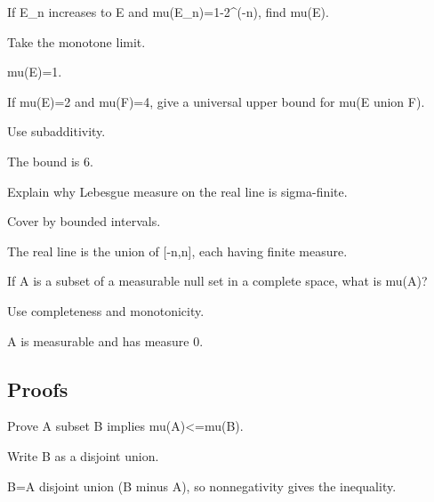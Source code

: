 \begin{exercise}\label{exr:iii01-expand-02}
If E\_n increases to E and mu(E\_n)=1-2\textasciicircum{}(-n), find mu(E).
\end{exercise}
\begin{hint}
Take the monotone limit.
\end{hint}
\begin{solution}
mu(E)=1.
\end{solution}

\begin{exercise}[Subadditivity]\label{exr:iii01-expand-03}
If mu(E)=2 and mu(F)=4, give a universal upper bound for mu(E union F).
\end{exercise}
\begin{hint}
Use subadditivity.
\end{hint}
\begin{solution}
The bound is 6.
\end{solution}

\begin{exercise}\label{exr:iii01-expand-04}
Explain why Lebesgue measure on the real line is sigma-finite.
\end{exercise}
\begin{hint}
Cover by bounded intervals.
\end{hint}
\begin{solution}
The real line is the union of [-n,n], each having finite measure.
\end{solution}

\begin{exercise}\label{exr:iii01-expand-05}
If A is a subset of a measurable null set in a complete space, what is mu(A)?
\end{exercise}
\begin{hint}
Use completeness and monotonicity.
\end{hint}
\begin{solution}
A is measurable and has measure 0.
\end{solution}

\subsection*{Proofs}

\begin{exercise}[Monotonicity]\label{exr:iii01-expand-06}
Prove A subset B implies mu(A)<=mu(B).
\end{exercise}
\begin{hint}
Write B as a disjoint union.
\end{hint}
\begin{solution}
B=A disjoint union (B minus A), so nonnegativity gives the inequality.
\end{solution}

